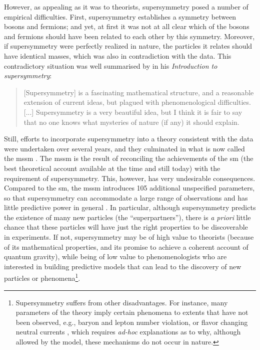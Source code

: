 \documentclass[smallextended]{svjour3}
\begin{document}
However, as appealing as it was to theorists, supersymmetry posed a number of empirical difficulties. First, supersymmetry establishes a symmetry between bosons and fermions; and yet, at first it was not  at all clear which of the bosons and fermions should have been related to each other by this symmetry. Moreover, if supersymmetry were perfectly realized in nature, the particles it relates should have identical masses, which was also in contradiction with the data. This contradictory situation was well summarised by \citet{Witten1982de} in his \textit{Introduction to supersymmetry}: 

\begin{quote}
    [Supersymmetry] is a fascinating mathematical structure, and a reasonable extension of current ideas, but plagued with phenomenological difficulties. [...] Supersymmetry is a very beautiful idea, but I think it is fair to say that no one knows what mysteries of nature (if any) it should explain.
\end{quote}

Still, efforts to incorporate supersymmetry into a theory consistent with the data were undertaken over several years, and they culminated in what is now called the \gls{mssm} \citep{Fayet1976cr,Dimopoulos1981}. The \gls{mssm} is the result of reconciling the achievements of the \gls{sm} (the best theoretical account available at the time and still today) with the requirement of supersymmetry. This, however, has very undesirable consequences. Compared to the \gls{sm}, the \gls{mssm} introduces 105 additional unspecified parameters, so that supersymmetry can accommodate a large range of observations and has little predictive power in general \citep[p.~1]{Parker1999}. In particular, although supersymmetry predicts the existence of many new particles (the ``superpartners''), there is \textit{a priori} little chance  that these particles will have just the right properties to be discoverable in experiments. If not, supersymmetry may be of high value to theorists (because of its mathematical properties, and its promise to achieve a coherent account of quantum gravity), while being of low value to phenomenologists who are interested in building predictive models that can lead to the discovery of new particles or phenomena\footnote{Supersymmetry suffers from other disadvantages. For instance, many parameters of the theory imply certain phenomena to extents that have not been observed, e.g., baryon and lepton number violation, or flavor changing neutral currents \citep[201--209,235--240]{weinberg1995the}, which requires \textit{ad-hoc} explanations as to why, although allowed by the model, these mechanisms do not occur in nature.}.
\end{document}
